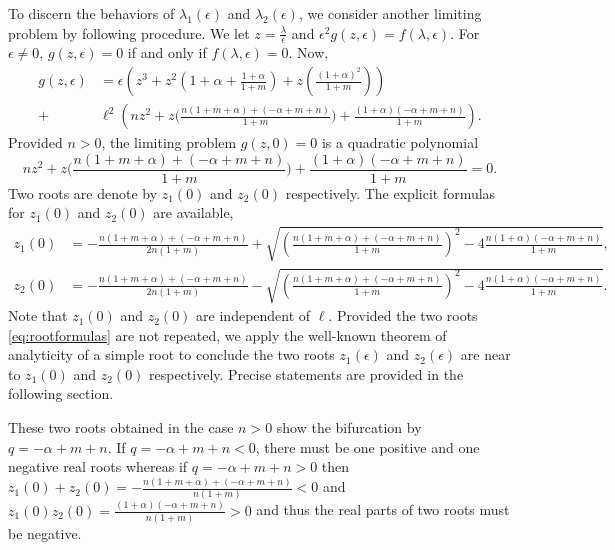 \documentclass[a4paper,11pt]{article}
\def\l{{\ell}}
\theoremstyle{remark}
\begin{document}
To discern the behaviors of $\lambda_1(\epsilon)$ and $\lambda_2(\epsilon)$, we consider another limiting problem by following procedure.
We let $z = \frac{\lambda}{\epsilon}$ and $\epsilon^2 g(z,\epsilon) =  f(\lambda, \epsilon)$. For $\epsilon\ne0$, $g(z,\epsilon)=0$ if and only if $f(\lambda,\epsilon)=0$. Now,
\begin{align}
 g(z,\epsilon) &= \epsilon\left( z^3 + z^2\left(1+\alpha + \tfrac{1+\alpha}{1+m}\right) + z\left(\tfrac{(1+\alpha)^2}{1+m}\right)\right) \nonumber\\
 +& \l^2\left(nz^2 + z\Big( \tfrac{n(1+m+\alpha) + (-\alpha+m+n)}{1+m}\Big) + \tfrac{(1+\alpha)(-\alpha+m+n)}{1+m}  \right). \label{eq:reduced_poly}
\end{align}
Provided $n>0$, the limiting problem $g(z,0)=0$ is a quadratic polynomial
\begin{equation}
nz^2 + z\Big( \frac{n(1+m+\alpha) + (-\alpha+m+n)}{1+m}\Big) + \frac{(1+\alpha)(-\alpha+m+n)}{1+m} =0. \label{eq:auxquad}
\end{equation}
Two roots are  denote by $z_1(0)$ and $z_2(0)$ respectively.  The explicit formulas for $z_1(0)$ and $z_2(0)$ are available,
\begin{equation}\label{eq:rootformulas}
\begin{aligned}
 z_1(0) &= -\tfrac{n(1+m+\alpha) + (-\alpha+m+n)}{2n(1+m)} + \sqrt{\left(\tfrac{n(1+m+\alpha) + (-\alpha+m+n)}{1+m}\right)^2 -4 \tfrac{n(1+\alpha)(-\alpha+m+n)}{1+m}},\\
z_2(0) &= -\tfrac{n(1+m+\alpha) + (-\alpha+m+n)}{2n(1+m)}  - \sqrt{\left(\tfrac{n(1+m+\alpha) + (-\alpha+m+n)}{1+m}\right)^2 -4 \tfrac{n(1+\alpha)(-\alpha+m+n)}{1+m}}.
\end{aligned}
\end{equation}
Note that $z_1(0)$ and $z_2(0)$ are independent of $\ell$. Provided the two roots  \eqref{eq:rootformulas} are not repeated, we apply the well-known theorem of analyticity of a simple root to conclude the two roots $z_1(\epsilon)$ and $z_2(\epsilon)$ are near to $z_1(0)$ and $z_2(0)$ respectively. Precise statements are provided in the following section.

These two roots obtained in the case $n>0$ show the bifurcation by $q=-\alpha+m+n$. If $q=-\alpha+m+n<0$, there must be one positive and one negative real roots whereas if $q=-\alpha+m+n>0$ then $z_1(0)+z_2(0) = -\frac{n(1+m+\alpha) + (-\alpha+m+n)}{n(1+m)} < 0$ and $z_1(0)z_2(0)=\frac{(1+\alpha)(-\alpha+m+n)}{n(1+m)}>0$ and thus the real parts of two roots must be negative.
\end{document}
